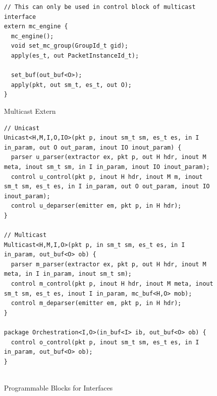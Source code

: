 \begin{figure}
\begin{lstlisting}[frame=none]
// This can only be used in control block of multicast interface
extern mc_engine {
  mc_engine();
  void set_mc_group(GroupId_t gid);
  apply(es_t, out PacketInstanceId_t);
  
  set_buf(out_buf<O>);
  apply(pkt, out sm_t, es_t, out O);  
}
\end{lstlisting}
\caption{Multicast Extern}
\label{fig:msa-multicast-extern}
\end{figure}


\begin{figure}
\begin{lstlisting}[frame=none]
// Unicast
Unicast<H,M,I,O,IO>(pkt p, inout sm_t sm, es_t es, in I in_param, out O out_param, inout IO inout_param) {
  parser u_parser(extractor ex, pkt p, out H hdr, inout M meta, inout sm_t sm, in I in_param, inout IO inout_param);
  control u_control(pkt p, inout H hdr, inout M m, inout sm_t sm, es_t es, in I in_param, out O out_param, inout IO inout_param);
  control u_deparser(emitter em, pkt p, in H hdr);                             
}

// Multicast
Multicast<H,M,I,O>(pkt p, in sm_t sm, es_t es, in I in_param, out_buf<O> ob) {
  parser m_parser(extractor ex, pkt p, out H hdr, inout M meta, in I in_param, inout sm_t sm);
  control m_control(pkt p, inout H hdr, inout M meta, inout sm_t sm, es_t es, inout I in_param, mc_buf<H,O> mob);
  control m_deparser(emitter em, pkt p, in H hdr);
}

package Orchestration<I,O>(in_buf<I> ib, out_buf<O> ob) {                         
  control o_control(pkt p, inout sm_t sm, es_t es, in I in_param, out_buf<O> ob);
}
    
\end{lstlisting}
\caption{Programmable Blocks for Interfaces}
\label{fig:programmable-blocks-for-interfaces}
\end{figure}



